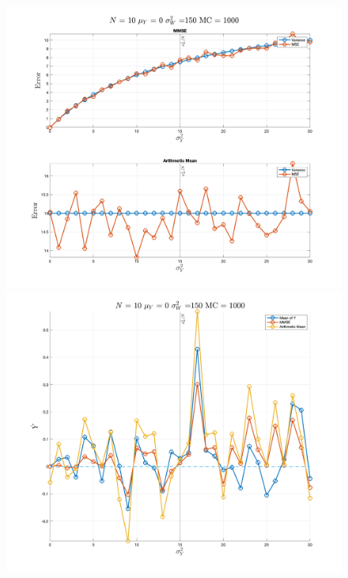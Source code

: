 \begin{figure}[H]
    \centering
    \begin{minipage}{0.45\textwidth}
        \centering
        \includegraphics[width=\textwidth]{./figures/appendix_a/figure_13.png}
    \end{minipage}
    \hfill
    \begin{minipage}{0.45\textwidth}
        \centering
        \includegraphics[width=\textwidth]{./figures/appendix_a/figure_14.png}
    \end{minipage}
\end{figure}

